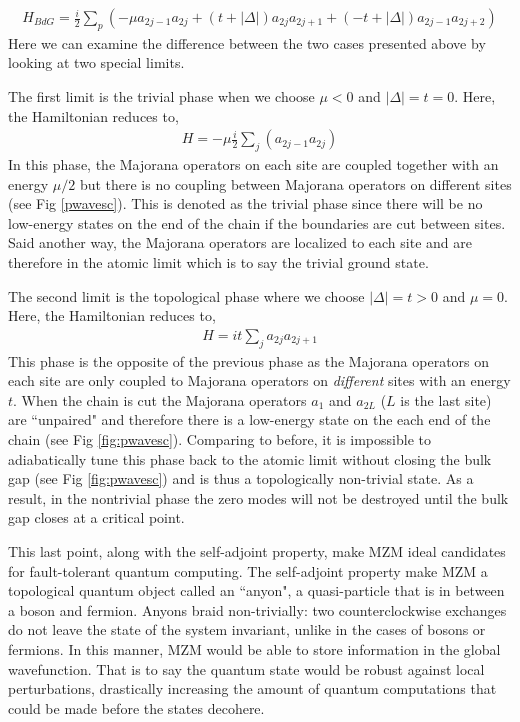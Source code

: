 \begin{align}
	H_{BdG} = \frac{i}{2}\sum_{p}\left(-\mu a_{2j-1}a_{2j}+(t+|\Delta|)a_{2j}a_{2j+1}+(-t+|\Delta|)a_{2j-1}a_{2j+2}\right)
\end{align}
Here we can examine the difference between the two cases presented above by looking at two special limits.\par 
The first limit is the trivial phase when we choose $\mu < 0$ and $|\Delta|=t=0$. Here, the Hamiltonian reduces to,
\begin{align}
	H = -\mu\frac{i}{2}\sum_{j}(a_{2j-1}a_{2j})
\end{align}
In this phase, the Majorana operators on each site are coupled together with an energy $\mu/2$ but there is no coupling between Majorana operators on different sites (see Fig \ref{pwavesc}). This is denoted as the trivial phase since there will be no low-energy states on the end of the chain if the boundaries are cut between sites. Said another way, the Majorana operators are localized to each site and are therefore in the atomic limit which is to say the trivial ground state.\par 
The second limit is the topological phase where we choose $|\Delta|=t>0$ and $\mu=0$. Here, the Hamiltonian reduces to,
\begin{align}
	H=it\sum_{j}a_{2j}a_{2j+1}
\end{align}
This phase is the opposite of the previous phase as the Majorana operators on each site are only coupled to Majorana operators on \textit{different} sites with an energy $t$. When the chain is cut the Majorana operators $a_{1}$ and $a_{2L}$ ($L$ is the last site) are ``unpaired" and therefore there is a low-energy state on the each end of the chain (see Fig \ref{fig:pwavesc}). Comparing to before, it is impossible to adiabatically tune this phase back to the atomic limit without closing the bulk gap (see Fig \ref{fig:pwavesc}) and is thus a topologically non-trivial state. As a result, in the nontrivial phase the zero modes will not be destroyed until the bulk gap closes at a critical point.\par 
This last point, along with the self-adjoint property, make \ac{MZM} ideal candidates for fault-tolerant quantum computing. The self-adjoint property make \ac{MZM} a topological quantum object called an ``anyon", a quasi-particle that is in between a boson and fermion. Anyons braid non-trivially: two counterclockwise exchanges do not leave the state of the system invariant, unlike in the cases of bosons or fermions\cite{Sarma2015, Knapp2019}. In this manner, \ac{MZM} would be able to store information in the global wavefunction. That is to say the quantum state would be robust against local perturbations, drastically increasing the amount of quantum computations that could be made before the states decohere.\par 

